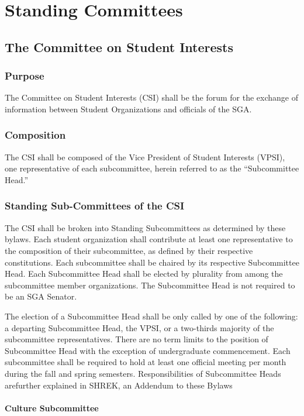 \documentclass[12pt]{scrreprt}
\begin{document}
\chapter{Standing Committees}

\section{The Committee on Student Interests} \label{sec:csi_representative}

\subsection{Purpose}
The Committee on Student Interests (CSI) shall be the forum for the exchange of
information between Student Organizations and officials of the SGA.

\subsection{Composition}
The CSI shall be composed of the Vice President of Student Interests (VPSI), one
representative of each subcommittee, herein referred to as the “Subcommittee Head.”

\subsection{Standing Sub-Committees of the CSI} \label{sec:csi_subcommittees}
The CSI shall be broken into Standing Subcommittees as determined by these bylaws. Each
student organization shall contribute at least one representative to the composition of their
subcommittee, as defined by their respective constitutions. Each subcommittee shall be
chaired by its respective Subcommittee Head. Each Subcommittee Head shall be elected by
plurality from among the subcommittee member organizations. The Subcommittee Head is
not required to be an SGA Senator.


The election of a Subcommittee Head shall be only called by one of the following: a departing Subcommittee Head, the VPSI, or a two-thirds majority of the subcommittee representatives. There are no term limits to the position of Subcommittee Head with the
exception of undergraduate commencement. Each subcommittee shall be required to hold at least one official meeting per month during
the fall and spring semesters. Responsibilities of Subcommittee Heads arefurther explained in SHREK, an Addendum to these Bylaws

\subsubsection{Culture Subcommittee}
\end{document}
